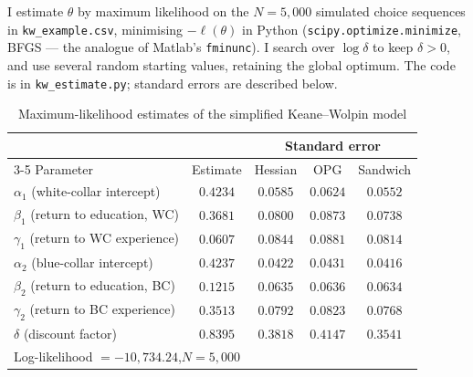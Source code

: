 \documentclass[11pt,english]{article}
\begin{document}
I estimate $\theta$ by maximum likelihood on the $N=5{,}000$ simulated choice
sequences in \texttt{kw\_example.csv}, minimising $-\ell(\theta)$ in Python
(\texttt{scipy.optimize.minimize}, BFGS --- the analogue of Matlab's
\texttt{fminunc}). I search over $\log\delta$ to keep $\delta>0$, and use several
random starting values, retaining the global optimum. The code is in
\texttt{kw\_estimate.py}; standard errors are described below.

\begin{table}[h]
\centering
\caption{Maximum-likelihood estimates of the simplified Keane--Wolpin model}
\begin{tabular}{lcccc}
\toprule
 & & \multicolumn{3}{c}{Standard error}\\ \cmidrule(l){3-5}
Parameter & Estimate & Hessian & OPG & Sandwich \\ \midrule
$\alpha_1$ (white-collar intercept)        & $0.4234$  & $0.0585$ & $0.0624$ & $0.0552$ \\
$\beta_1$ (return to education, WC)         & $0.3681$  & $0.0800$ & $0.0873$ & $0.0738$ \\
$\gamma_1$ (return to WC experience)        & $0.0607$  & $0.0844$ & $0.0881$ & $0.0814$ \\
$\alpha_2$ (blue-collar intercept)          & $0.4237$  & $0.0422$ & $0.0431$ & $0.0416$ \\
$\beta_2$ (return to education, BC)          & $0.1215$  & $0.0635$ & $0.0636$ & $0.0634$ \\
$\gamma_2$ (return to BC experience)        & $0.3513$  & $0.0792$ & $0.0823$ & $0.0768$ \\
$\delta$ (discount factor)                  & $0.8395$  & $0.3818$ & $0.4147$ & $0.3541$ \\ \midrule
\multicolumn{5}{l}{Log-likelihood $=-10{,}734.24$,\quad $N=5{,}000$}\\
\bottomrule
\end{tabular}
\end{table}
\end{document}
